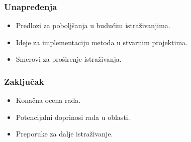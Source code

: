 \documentclass{beamer}
\begin{document}
\begin{frame}
\frametitle{Unapređenja}
\begin{itemize}
    \item Predlozi za poboljšanja u budućim istraživanjima.
    \item Ideje za implementaciju metoda u stvarnim projektima.
    \item Smerovi za proširenje istraživanja.
\end{itemize}
\end{frame}

\begin{frame}
\frametitle{Zaključak}
\begin{itemize}
    \item Konačna ocena rada.
    \item Potencijalni doprinosi rada u oblasti.
    \item Preporuke za dalje istraživanje.
\end{itemize}
\end{frame}
\end{document}
